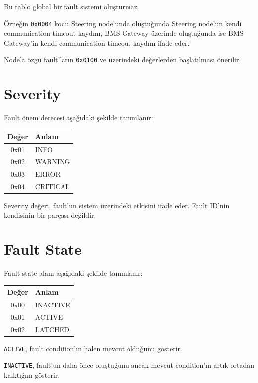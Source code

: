 \documentclass[a4paper,11pt]{article}
\begin{document}
Bu tablo global bir fault sistemi oluşturmaz.

Örneğin \texttt{0x0004} kodu Steering node'unda oluştuğunda
Steering node'un kendi communication timeout kaydını,
BMS Gateway üzerinde oluştuğunda ise BMS Gateway'in kendi
communication timeout kaydını ifade eder.

Node'a özgü fault'ların \texttt{0x0100} ve üzerindeki değerlerden
başlatılması önerilir.

\section{Severity}

Fault önem derecesi aşağıdaki şekilde tanımlanır:

\begin{center}
\begin{tabular}{c l}
\toprule
\textbf{Değer} & \textbf{Anlam} \\
\midrule
0x01 & INFO \\
0x02 & WARNING \\
0x03 & ERROR \\
0x04 & CRITICAL \\
\bottomrule
\end{tabular}
\end{center}

Severity değeri, fault'un sistem üzerindeki etkisini ifade eder.
Fault ID'nin kendisinin bir parçası değildir.

\section{Fault State}

Fault state alanı aşağıdaki şekilde tanımlanır:

\begin{center}
\begin{tabular}{c l}
\toprule
\textbf{Değer} & \textbf{Anlam} \\
\midrule
0x00 & INACTIVE \\
0x01 & ACTIVE \\
0x02 & LATCHED \\
\bottomrule
\end{tabular}
\end{center}

\texttt{ACTIVE}, fault condition'ın halen mevcut olduğunu gösterir.

\texttt{INACTIVE}, fault'un daha önce oluştuğunu ancak mevcut
condition'ın artık ortadan kalktığını gösterir.
\end{document}
